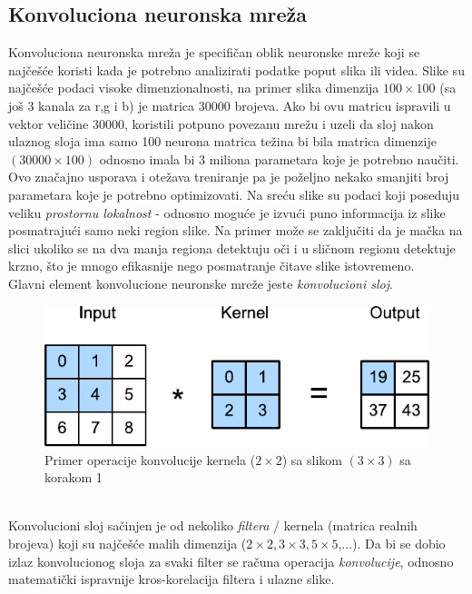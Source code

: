 \documentclass[a4paper,fleqn,12pt]{JMThesis}
\theoremstyle{plain}
\theoremstyle{definition}
\theoremstyle{definition}
\begin{document}
\subsection{Konvoluciona neuronska mreža}
Konvoluciona neuronska mreža je specifičan oblik neuronske mreže koji se najčešće koristi kada je potrebno analizirati podatke
poput slika ili videa. Slike su najčešće podaci visoke dimenzionalnosti, na primer slika dimenzija $100 \times 100$ (sa još 3 kanala
za r,g i b) je matrica 30000 brojeva. Ako bi ovu matricu ispravili u vektor veličine 30000, koristili potpuno povezanu mrežu i uzeli da 
sloj nakon ulaznog sloja ima samo 100 neurona matrica težina bi bila matrica dimenzije $(30000 \times 100)$ 
odnosno imala bi 3 miliona parametara koje je potrebno naučiti. Ovo značajno usporava i otežava
treniranje pa je poželjno nekako smanjiti broj parametara koje je potrebno optimizovati. Na sreću slike su podaci koji poseduju
veliku \textit{prostornu lokalnost} - odnosno moguće je izvući puno informacija iz slike posmatrajući samo neki region slike.
Na primer može se zaključiti da je mačka na slici ukoliko se na dva manja regiona detektuju oči i u sličnom regionu detektuje
krzno, što je mnogo efikasnije nego posmatranje čitave slike istovremeno. \\
Glavni element konvolucione neuronske mreže jeste \textit{konvolucioni sloj}.
\begin{figure}[!ht]
	\centering
    \includegraphics{../graph-visuals/convolution-example.pdf}
	\caption{Primer operacije konvolucije kernela ($2 \times 2$) sa slikom $(3 \times 3)$ sa korakom 1}
\end{figure}\\
Konvolucioni sloj sačinjen je od nekoliko \textit{filtera} / kernela (matrica realnih brojeva) koji su najčešće malih dimenzija ($2\times 2,3 \times 3,5 \times 5$,...).
Da bi se dobio izlaz konvolucionog sloja za svaki filter se računa operacija \textit{konvolucije}, odnosno matematički ispravnije
kros-korelacija filtera i ulazne slike.
\end{document}
